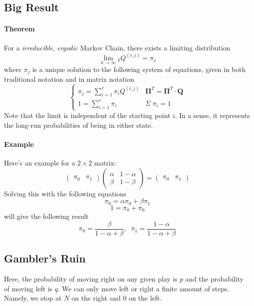 \documentclass[a4paper,12pt]{scrartcl}
\begin{document}
\subsection{Big Result}
\paragraph{Theorem} For a \emph{irreducible}, \emph{ergodic} Markov
Chain, there exists a limiting distribution
   \[ \lim_{k\rightarrow \infty} {}_kQ^{(i,j)} = \pi_j \]
where $\pi_j$ is a unique solution to the following system of equations,
given in both traditional notation and in matrix notation
   \[ \begin{cases} \pi_j = \sum^r_{i=1} \pi_i Q^{(i,j)} & 
      \mathbf{\Pi}^T = \mathbf{\Pi}^T \cdot \mathbf{Q} \\ 
      1 = \sum^r_{i=1} \pi_i  & \Sigma \; \pi_i = 1 \end{cases} \]
Note that the limit is independent of the starting point $i$. In a 
sense, it represents the long-run probabilities of being in either state.

\paragraph{Example} Here's an example for a $2 \times 2$ matrix:
\[ \begin{pmatrix} \pi_0 & \pi_1 \end{pmatrix}  
   \begin{pmatrix} \alpha & 1-\alpha \\ \beta & 1-\beta \end{pmatrix}
   = \begin{pmatrix} \pi_0 & \pi_1 \end{pmatrix}  \]
Solving this with the following equations
   \[ \pi_0 = \alpha \pi_0 + \beta \pi_1 \]
   \[ 1 = \pi_0 + \pi_0 \]
will give the following result
   \[ \pi_0 = \frac{\beta}{1-\alpha + \beta}, \;\;
      \pi_1 = \frac{1-\alpha}{1-\alpha + \beta} \]

\subsection{Gambler's Ruin}

Here, the probability of moving right on any given play is $p$ and
the probability of moving left is $q$.  We can only move left or 
right a finite amount of steps. Namely, we stop at $N$ on the right
and $0$ on the left. 
\end{document}
